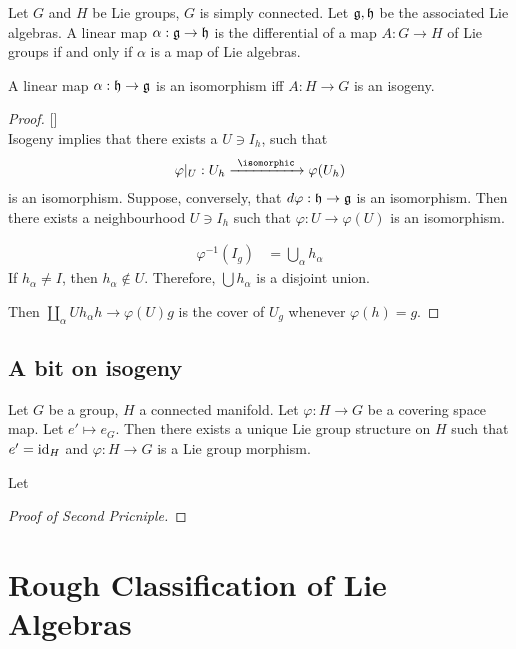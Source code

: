 Let $G$ and $H$ be Lie groups, $G$ is simply connected. Let $\mathfrak{g}, \mathfrak{h}$ be the associated Lie algebras. A linear map $\alpha: \mathfrak{g} \to \mathfrak{h}$ is the differential of a map $A: G\to H$ of Lie groups if and only if $\alpha$ is a map of Lie algebras.

\begin{proposition}
   A linear map $\alpha: \mathfrak{h} \to \mathfrak{g}$  is an isomorphism iff $A: H\to G$ is an isogeny.
\end{proposition}

\begin{proof}  {[]} \\
Isogeny implies that there exists a $U\ni I_h$, such that
\begin{align}
    \varphi|_U : U_h \xrightarrow{\ \isomorphic\ } \varphi(U_h)
\end{align}
is an isomorphism.
Suppose, conversely, that $d\varphi: \mathfrak{h}\to \mathfrak{g}$ is an isomorphism. Then there exists a neighbourhood $U\ni I_h$ such that $    \varphi: U\to \varphi(U)$ is an isomorphism.

\begin{align}
    \varphi^{-1} (I_g) &= \bigcup_\alpha h_\alpha 
\end{align}
If $h_\alpha \neq I$, then $h_\alpha \not\in U$. Therefore, $\bigcup h_\alpha$ is a disjoint union.


Then $\coprod_\alpha U h_\alpha h\to \varphi(U)g$  is the cover of $U_g$ whenever $\varphi(h)=g$.

\end{proof}

\subsection{A bit on isogeny}
\label{sub:a_bit_on_isogeny}

Let $G$ be a group, $H$ a connected manifold. Let $\varphi: H\to G$ be a covering space map. Let $e' \mapsto e_G$. Then there exists a unique Lie group structure on $H$ such that  $e' = \operatorname{id}_H$ and $\varphi: H\to G$ is a Lie group morphism.

\begin{proposition}
   Let   
\end{proposition}

\begin{proof}[Proof of Second Pricniple]
\end{proof}

\section{Rough Classification of Lie Algebras}
\label{sec:rough_classification_of_lie_algebras}

